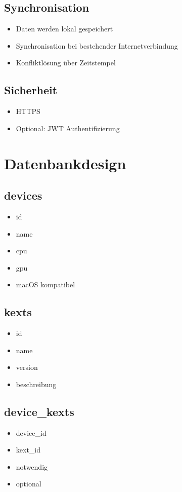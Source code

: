 \documentclass[a4paper,12pt]{article}
\begin{document}
\subsection{Synchronisation}
\begin{itemize}
\item Daten werden lokal gespeichert
\item Synchronisation bei bestehender Internetverbindung
\item Konfliktlösung über Zeitstempel
\end{itemize}

\subsection{Sicherheit}
\begin{itemize}
\item HTTPS
\item Optional: JWT Authentifizierung
\end{itemize}

\section{Datenbankdesign}

\subsection{devices}
\begin{itemize}
\item id
\item name
\item cpu
\item gpu
\item macOS kompatibel
\end{itemize}

\subsection{kexts}
\begin{itemize}
\item id
\item name
\item version
\item beschreibung
\end{itemize}

\subsection{device\_kexts}
\begin{itemize}
\item device\_id
\item kext\_id
\item notwendig
\item optional
\end{itemize}
\end{document}
